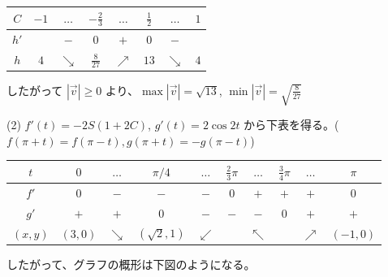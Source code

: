 \documentclass[../main.tex]{subfiles}
\begin{document}
\begin{center}
  \begin{tabular}{c|ccccccc}
    $C$ & $-1$ & $\dots$ & $-\frac{2}{3}$ & $\dots$ & $\frac{1}{2}$ & $\dots$ & $1$ \\ \hline
    $h'$ & & $-$ & $0$ & $+$ & $0$ & $-$ & \\ \hline
    $h$ & $4$ & $\searrow$ & $\frac{8}{27}$ & $\nearrow$ & $13$ & $\searrow$ & $4$
  \end{tabular}
\end{center}

したがって $|\vec{v}| \ge 0$ より、$\max |\vec{v}| = \sqrt{13}$, $\min |\vec{v}| = \sqrt{\frac{8}{27}}$ \quad \text{\#\#}

\bigskip
\noindent
(2) $f'(t) = -2S(1+2C)$, $g'(t) = 2\cos 2t$ から下表を得る。($f(\pi+t) = f(\pi-t), g(\pi+t) = -g(\pi-t)$)

\begin{center}
  \begin{tabular}{c|ccccccccc}
    $t$ & $0$ & $\dots$ & $\pi/4$ & $\dots$ & $\frac{2}{3}\pi$ & $\dots$ & $\frac{3}{4}\pi$ & $\dots$ & $\pi$ \\ \hline
    $f'$ & $0$ & $-$ & $-$ & $-$ & $0$ & $+$ & $+$ & $+$ & $0$ \\ \hline
    $g'$ & $+$ & $+$ & $0$ & $-$ & $-$ & $-$ & $0$ & $+$ & $+$ \\ \hline
    $(x,y)$ & $(3,0)$ & $\searrow$ & $(\sqrt{2},1)$ & $\swarrow$ & & $\nwarrow$ & & $\nearrow$ & $(-1,0)$
  \end{tabular}
\end{center}

したがって、グラフの概形は下図のようになる。

\begin{center}
\end{center}
\end{document}

